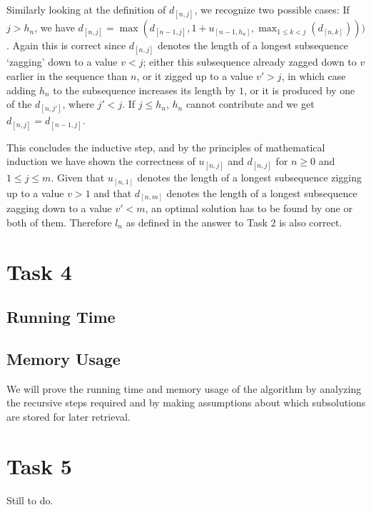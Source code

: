 \documentclass[paper=a4, fleqn]{article}
\begin{document}
Similarly looking at the definition of $d_{[n, j]}$, we recognize two possible
cases: If $j>h_n$, we have $d_{[n, j]}=\max(d_{[n-1,j]}, 1+u_{[n-1,h_n]},
\max_{1\leq k<j}(d_{[n,k]})))$. Again this is correct since $d_{[n, j]}$ denotes
the length of a longest subsequence `zagging' down to a value $v<j$; either this
subsequence already zagged down to $v$ earlier in the sequence than $n$, or it
zigged up to a value $v'>j$, in which case adding $h_n$ to the subsequence
increases its length by $1$, or it is produced by one of the $d_{[n, j']}$,
where $j'<j$. If $j\leq h_n$, $h_n$ cannot contribute and we get $d_{[n,
  j]}=d_{[n-1, j]}$.

This concludes the inductive step, and by the principles of mathematical
induction we have shown the correctness of $u_{[n, j]}$ and $d_{[n, j]}$ for
$n\geq 0$ and $1\leq j\leq m$. Given that $u_{[n, 1]}$ denotes the length of a
longest subsequence zigging up to a value $v>1$ and that $d_{[n, m]}$ denotes
the length of a longest subsequence zagging down to a value $v'<m$, an optimal
solution has to be found by one or both of them. Therefore $l_n$ as defined in
the answer to Task 2 is also correct.

\section*{Task 4}

\subsection*{Running Time}



\subsection*{Memory Usage}


We will prove the running time and memory usage of the algorithm by analyzing
the recursive steps required and by making assumptions about which subsolutions
are stored for later retrieval.

\section*{Task 5}

Still to do.
\end{document}
